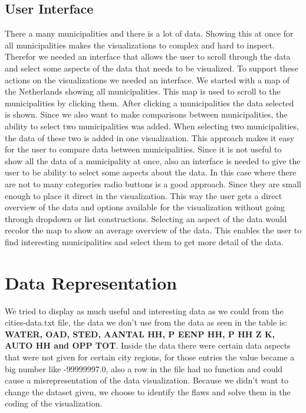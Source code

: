 \documentclass[a4paper,twoside,11pt]{article}
\begin{document}
\subsection{User Interface}
There a many municipalities and there is a lot of data. Showing this at once for all municipalities makes the visualizations to complex and hard to inspect. Therefor we needed an interface that allows the user to scroll through the data and select some aspects of the data that needs to be visualized. To support these actions on the visualizations we needed an interface. \newline
We started with a map of the Netherlands showing all municipalities. This map is used to scroll to the municipalities by clicking them. After clicking a municipalities the data selected is shown.  Since we also want to make comparisons between municipalities, the ability to select two municipalities was added. When selecting two municipalities, the data of these two is added in one visualization. This approach makes it easy for the user to compare data between municipalities. \newline
Since it is not useful to show all the data of a municipality at once, also an interface is needed to give the user to be ability to select some aspects about the data. In this case where there are not to many categories radio buttons is a good approach. Since they are small enough to place it direct in the visualization. This way the user gets a direct overview of the data and options available for the visualization without going through dropdown or list constructions. Selecting an aspect of the data would recolor the map to show an average overview of the data. This enables the user to find interesting municipalities and select them to get more detail of the data.
\newpage
\section{Data Representation}
We tried to display as much useful and interesting data as we could from the cities-data.txt file, the data we don't use from the data as seen in the table is: \textbf{WATER, OAD, STED, AANTAL HH, P EENP HH, P HH Z K, AUTO HH and OPP TOT}. \newline
Inside the data there were certain data aspects that were not given for certain city regions, for those entries the value became a big number like -99999997.0, also a row in the file had no function and could cause a misrepresentation of the data visualization. Because we didn't want to change the dataset given, we choose to identify the flaws and solve them in the coding of the visualization. \newline
\newpage
\end{document}

